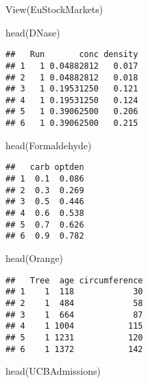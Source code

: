 \documentclass[
]{article}
\newenvironment{Shaded}{\begin{snugshade}}{\end{snugshade}}
\newcommand{\FunctionTok}[1]{\textcolor[rgb]{0.00,0.00,0.00}{#1}}
\newcommand{\NormalTok}[1]{#1}
\begin{document}
\begin{Shaded}
\begin{Highlighting}[]
\FunctionTok{View}\NormalTok{(EuStockMarkets)}
\end{Highlighting}
\end{Shaded}

\begin{Shaded}
\begin{Highlighting}[]
\FunctionTok{head}\NormalTok{(DNase)}
\end{Highlighting}
\end{Shaded}

\begin{verbatim}
##   Run       conc density
## 1   1 0.04882812   0.017
## 2   1 0.04882812   0.018
## 3   1 0.19531250   0.121
## 4   1 0.19531250   0.124
## 5   1 0.39062500   0.206
## 6   1 0.39062500   0.215
\end{verbatim}

\begin{Shaded}
\begin{Highlighting}[]
\FunctionTok{head}\NormalTok{(Formaldehyde)}
\end{Highlighting}
\end{Shaded}

\begin{verbatim}
##   carb optden
## 1  0.1  0.086
## 2  0.3  0.269
## 3  0.5  0.446
## 4  0.6  0.538
## 5  0.7  0.626
## 6  0.9  0.782
\end{verbatim}

\begin{Shaded}
\begin{Highlighting}[]
\FunctionTok{head}\NormalTok{(Orange)}
\end{Highlighting}
\end{Shaded}

\begin{verbatim}
##   Tree  age circumference
## 1    1  118            30
## 2    1  484            58
## 3    1  664            87
## 4    1 1004           115
## 5    1 1231           120
## 6    1 1372           142
\end{verbatim}

\begin{Shaded}
\begin{Highlighting}[]
\FunctionTok{head}\NormalTok{(UCBAdmissions)}
\end{Highlighting}
\end{Shaded}
\end{document}
